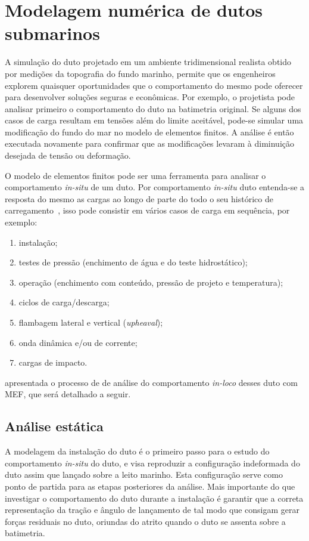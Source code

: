 \chapter{Modelagem numérica de dutos submarinos\label{chap:assentamento}}


A simulação do duto projetado em um ambiente tridimensional realista obtido por medições da topografia do fundo marinho, permite que os engenheiros explorem quaisquer oportunidades que o comportamento do mesmo pode oferecer para desenvolver soluções seguras e econômicas.
Por exemplo, o projetista pode analisar primeiro o comportamento do duto na batimetria original.
Se alguns dos casos de carga resultam em tensões além do limite aceitável, pode-se simular uma modificação do fundo do mar no modelo de elementos finitos.
A análise é então executada novamente para confirmar que as modificações levaram à diminuição desejada de tensão ou deformação.

O modelo de elementos finitos pode ser uma ferramenta para analisar o comportamento \textit{in-situ} de um duto.
Por comportamento \textit{in-situ} duto entenda-se a resposta do mesmo as cargas ao longo de parte do todo o seu histórico de carregamento~\cite{Bai2014}, isso pode consistir em vários casos de carga em sequência, por exemplo:

\begin{enumerate}
    \item instalação;
    \item testes de pressão (enchimento de água e do teste hidrostático);
    \item operação (enchimento com conteúdo, pressão de projeto e temperatura);
    \item ciclos de carga/descarga;
    \item flambagem lateral e vertical (\textit{upheaval});
    \item onda dinâmica e/ou de corrente;
    \item cargas de impacto.
\end{enumerate}

 apresentada o processo de de análise do comportamento \textit{in-loco} desses duto com MEF, que será detalhado a seguir.


\section{Análise estática}


A modelagem da instalação do duto é o primeiro passo para o estudo do comportamento \textit{in-situ} do duto, e visa reproduzir a configuração indeformada do duto assim que lançado sobre a leito marinho.
Esta configuração serve como ponto de partida para as etapas posteriores da análise.
Mais importante do que investigar o comportamento do duto durante a instalação é garantir que a correta representação da tração e ângulo de lançamento de tal modo que consigam gerar forças residuais no duto, oriundas do atrito quando o duto se assenta sobre a batimetria.

